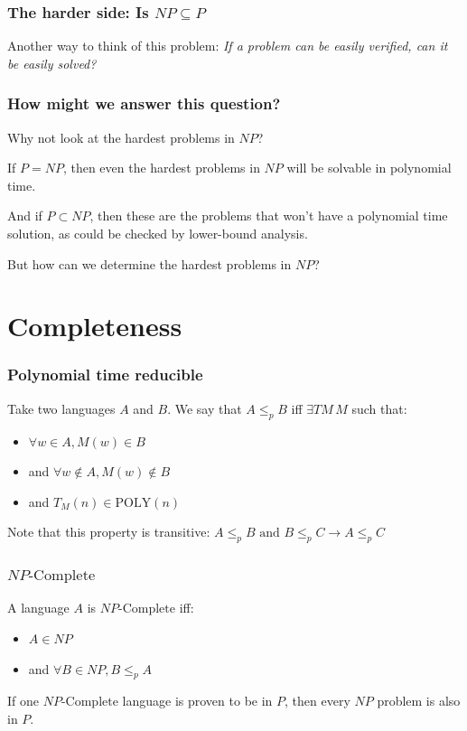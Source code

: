 \documentclass[aspectratio=169]{beamer}
\begin{document}
\begin{frame}
\frametitle{The harder side: Is $NP \subseteq P$}

Another way to think of this problem: {\em If a problem can be easily verified, can it be easily solved?}
\end{frame}

\begin{frame}
\frametitle{How might we answer this question?}

Why not look at the hardest problems in $NP$?

If $P = NP$, then even the hardest problems in $NP$ will be solvable in polynomial time.

And if $P \subset NP$, then these are the problems that won't have a polynomial time solution, as could be checked by lower-bound analysis.

But how can we determine the hardest problems in $NP$?
\end{frame}

\section{Completeness}

\begin{frame}
\frametitle{Polynomial time reducible}

Take two languages $A$ and $B$. We say that $A \leq_p B$ iff $\exists TM\, M$ such that:

\begin{itemize}
	\item $\forall w \in A, M(w) \in B$
	\item and $\forall w \notin A, M(w) \notin B$
	\item and $T_M(n) \in \mathrm{POLY}(n)$
\end{itemize}

Note that this property is transitive: $A \leq_p B \text{ and } B \leq_p C \to A \leq_p C$

\end{frame}

\begin{frame}
\frametitle{$NP\text{-Complete}$}

A language $A$ is $NP\text{-Complete}$ iff:

\begin{itemize}
	\item $A \in NP$
	\item and $\forall B \in NP, B \leq_p A$
\end{itemize}

If one $NP\text{-Complete}$ language is proven to be in $P$, then every $NP$ problem is also in $P$.
\end{frame}
\end{document}
